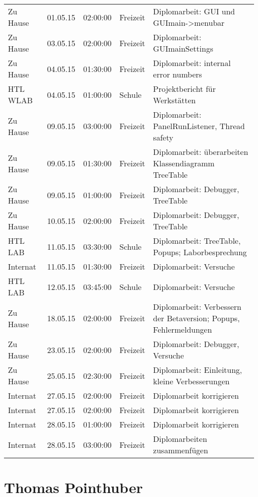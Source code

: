 \begin{small}
\begin{longtable}{ p{} p{} p{} p{} p{}}
Zu Hause	& 01.05.15	& 02:00:00	& Freizeit	& Diplomarbeit: GUI und GUImain->menubar \\
Zu Hause	& 03.05.15	& 02:00:00	& Freizeit	& Diplomarbeit: GUImainSettings \\
Zu Hause	& 04.05.15	& 01:30:00	& Freizeit	& Diplomarbeit: internal error numbers \\
HTL WLAB	& 04.05.15	& 01:00:00	& Schule	& Projektbericht f\"ur Werkst\"atten \\
Zu Hause	& 09.05.15	& 03:00:00	& Freizeit	& Diplomarbeit: PanelRunListener, Thread safety \\
Zu Hause	& 09.05.15	& 01:30:00	& Freizeit	& Diplomarbeit: \"uberarbeiten Klassendiagramm TreeTable \\
Zu Hause	& 09.05.15	& 01:00:00	& Freizeit	& Diplomarbeit: Debugger, TreeTable \\
Zu Hause	& 10.05.15	& 02:00:00	& Freizeit	& Diplomarbeit: Debugger, TreeTable \\
HTL LAB	& 11.05.15	& 03:30:00	& Schule	& Diplomarbeit: TreeTable, Popups; Laborbesprechung \\
Internat	& 11.05.15	& 01:30:00	& Freizeit	& Diplomarbeit: Versuche \\
HTL LAB	& 12.05.15	& 03:45:00	& Schule	& Diplomarbeit: Versuche \\
Zu Hause	& 18.05.15	& 02:00:00	& Freizeit	& Diplomarbeit: Verbessern der Betaversion; Popups, Fehlermeldungen \\
Zu Hause	& 23.05.15	& 02:00:00	& Freizeit	& Diplomarbeit: Debugger, Versuche \\
Zu Hause	& 25.05.15	& 02:30:00	& Freizeit	& Diplomarbeit: Einleitung, kleine Verbesserungen \\
Internat	& 27.05.15	& 02:00:00	& Freizeit	& Diplomarbeit korrigieren \\
Internat	& 27.05.15	& 02:00:00	& Freizeit	& Diplomarbeit korrigieren \\
Internat	& 28.05.15	& 01:00:00	& Freizeit	& Diplomarbeit korrigieren \\
Internat	& 28.05.15	& 03:00:00	& Freizeit	& Diplomarbeiten zusammenf\"ugen \\
 \end{longtable}
\end{small}

\section{Thomas Pointhuber}

